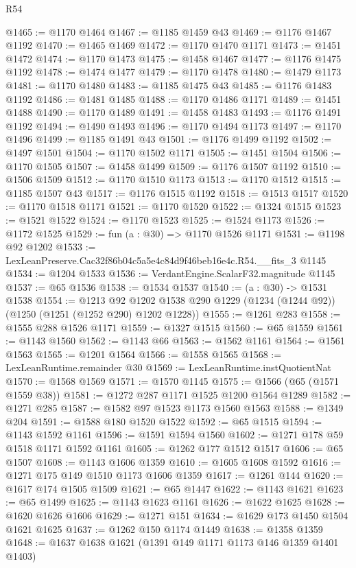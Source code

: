 \begin{lexlean}{R54}
\begin{coremodule}
@1465 := @1170 @1464
@1467 := @1185 @1459 @43
@1469 := @1176 @1467 @1192
@1470 := @1465 @1469
@1472 := @1170 @1470 @1171
@1473 := @1451 @1472
@1474 := @1170 @1473
@1475 := @1458 @1467
@1477 := @1176 @1475 @1192
@1478 := @1474 @1477
@1479 := @1170 @1478
@1480 := @1479 @1173
@1481 := @1170 @1480
@1483 := @1185 @1475 @43
@1485 := @1176 @1483 @1192
@1486 := @1481 @1485
@1488 := @1170 @1486 @1171
@1489 := @1451 @1488
@1490 := @1170 @1489
@1491 := @1458 @1483
@1493 := @1176 @1491 @1192
@1494 := @1490 @1493
@1496 := @1170 @1494 @1173
@1497 := @1170 @1496
@1499 := @1185 @1491 @43
@1501 := @1176 @1499 @1192
@1502 := @1497 @1501
@1504 := @1170 @1502 @1171
@1505 := @1451 @1504
@1506 := @1170 @1505
@1507 := @1458 @1499
@1509 := @1176 @1507 @1192
@1510 := @1506 @1509
@1512 := @1170 @1510 @1173
@1513 := @1170 @1512
@1515 := @1185 @1507 @43
@1517 := @1176 @1515 @1192
@1518 := @1513 @1517
@1520 := @1170 @1518 @1171
@1521 := @1170 @1520
@1522 := @1324 @1515
@1523 := @1521 @1522
@1524 := @1170 @1523
@1525 := @1524 @1173
@1526 := @1172 @1525
@1529 := fun (a : @30) => @1170 @1526 @1171
@1531 := @1198 @92 @1202
@1533 := LexLeanPreserve.Cac32f86b04c5a5e4c84d9f46beb16e4c.R54.__fits_3 @1145
@1534 := @1204 @1533
@1536 := VerdantEngine.ScalarF32.magnitude @1145
@1537 := @65 @1536
@1538 := @1534 @1537
@1540 := (a : @30) -> @1531 @1538
@1554 := @1213
    @92
    @1202
    @1538
    @290
    @1229
    (@1234 (@1244 @92))
    (@1250 (@1251 (@1252 @290) @1202 @1228))
@1555 := @1261 @283
@1558 := @1555 @288 @1526 @1171
@1559 := @1327 @1515
@1560 := @65 @1559
@1561 := @1143 @1560
@1562 := @1143 @66
@1563 := @1562 @1161
@1564 := @1561 @1563
@1565 := @1201 @1564
@1566 := @1558 @1565
@1568 := LexLeanRuntime.remainder @30
@1569 := LexLeanRuntime.instQuotientNat
@1570 := @1568 @1569
@1571 := @1570 @1145
@1575 := @1566 (@65 (@1571 @1559 @38))
@1581 := @1272 @287 @1171 @1525 @1200 @1564 @1289
@1582 := @1271 @285
@1587 := @1582 @97 @1523 @1173 @1560 @1563
@1588 := @1349 @204
@1591 := @1588 @180 @1520 @1522
@1592 := @65 @1515
@1594 := @1143 @1592 @1161
@1596 := @1591 @1594 @1560
@1602 := @1271 @178 @59 @1518 @1171 @1592 @1161
@1605 := @1262 @177 @1512 @1517
@1606 := @65 @1507
@1608 := @1143 @1606 @1359
@1610 := @1605 @1608 @1592
@1616 := @1271 @175 @149 @1510 @1173 @1606 @1359
@1617 := @1261 @144
@1620 := @1617 @174 @1505 @1509
@1621 := @65 @1447
@1622 := @1143 @1621
@1623 := @65 @1499
@1625 := @1143 @1623 @1161
@1626 := @1622 @1625
@1628 := @1620 @1626 @1606
@1629 := @1271 @151
@1634 := @1629 @173 @1450 @1504 @1621 @1625
@1637 := @1262 @150 @1174 @1449
@1638 := @1358 @1359
@1648 := @1637 @1638 @1621 (@1391 @149 @1171 @1173 @146 @1359 @1401 @1403)

\end{coremodule}
\end{lexlean}
